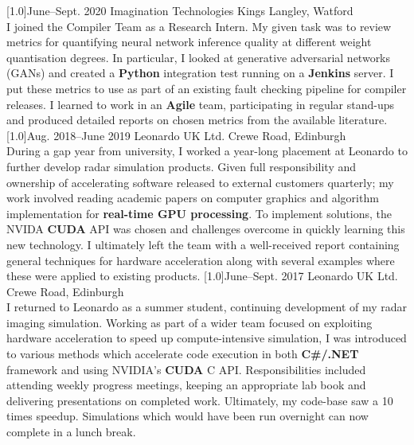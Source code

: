 \documentclass[]{cv-style}     %
\begin{document}
\begin{entrylist}
{\begin{itemize}
\end{itemize}
}
\entry
  {\scalebox{.8}[1.0]{June--Sept.  2020}}
  {Imagination Technologies}
  {Kings Langley, Watford}
  {\\
 I joined the Compiler Team as a Research Intern. My given task was to review metrics for quantifying neural network inference quality at different weight quantisation degrees. In particular, I looked at generative adversarial networks (GANs) and created a \textbf{Python} integration test running on a \textbf{Jenkins} server. I put these metrics to use as part of an existing fault checking pipeline for compiler releases. I learned to work in an \textbf{Agile} team, participating in regular stand-ups and produced detailed reports on chosen metrics from the available literature. 
 }
\entry
  {\scalebox{.8}[1.0]{Aug. 2018--June 2019}}
  {Leonardo UK Ltd.}
  {Crewe Road, Edinburgh}
  {\\
  During a gap year from university, I worked a year-long placement at Leonardo to further develop radar simulation products. Given full responsibility and ownership of accelerating software released to external customers quarterly; my work involved reading academic papers on computer graphics and algorithm implementation for \textbf{real-time GPU processing}. To implement solutions, the NVIDA \textbf{CUDA} API was chosen and challenges overcome in quickly learning this new technology. I ultimately left the team with a well-received report containing  general techniques for hardware acceleration along with several examples where these were applied to existing products.
}
\entry
  {\scalebox{.8}[1.0]{June--Sept. 2017}}
  {Leonardo UK Ltd.}
  {Crewe Road, Edinburgh}
  {\\
 I returned to Leonardo as a summer student, continuing development of my radar imaging simulation. Working as part of a wider team focused on exploiting hardware acceleration to speed up compute-intensive simulation, I was introduced to various methods which accelerate code execution in both \textbf{C\#/.NET} framework and using NVIDIA's \textbf{CUDA} C API. Responsibilities included attending weekly progress meetings, keeping an appropriate lab book and delivering presentations on completed work.
 Ultimately, my code-base saw a 10 times speedup. Simulations which would have been run overnight can now complete in a lunch break.
}
\entry

\end{entrylist}
\end{document}
